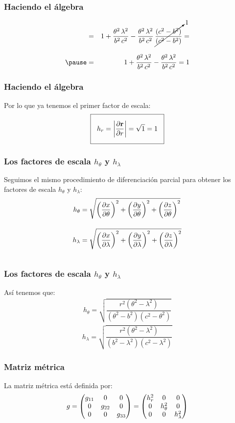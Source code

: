 \begin{frame}
\frametitle{Haciendo el álgebra}
\begin{eqnarray*}
&=& 1 + \dfrac{\theta^{2} \, \lambda^{2}}{b^{2} \, c^{2}} - \dfrac{\theta^{2} \, \lambda^{2}}{b^{2} \, c^{2}} \, \cancelto{1}{\dfrac{(c^{2} - b^{2})}{(c^{2} - b^{2})}} = \\[1em] \pause
&=& 1 + \dfrac{\theta^{2} \, \lambda^{2}}{b^{2} \, c^{2}} - \dfrac{\theta^{2} \, \lambda^{2}}{b^{2} \, c^{2}} =  1
\end{eqnarray*}
\end{frame}
\begin{frame}
\frametitle{Haciendo el álgebra}
Por lo que ya tenemos el primer factor de escala:
\begin{align*}
\setlength{\fboxsep}{3\fboxsep}\boxed{h_{r} = \abs{\pdv{\vb{r}}{r}} = \sqrt{1} = 1}
\end{align*}
\end{frame}
\begin{frame}
\frametitle{Los factores de escala $h_{\theta}$ y $h_{\lambda}$}
Seguimos el mismo procedimiento de diferenciación parcial para obtener los factores de escala $h_{\theta}$ y $h_{\lambda}$:
\begin{align*}
h_{\theta} &= \sqrt{\left( \pdv{x}{\theta} \right)^{2} + \left( \pdv{y}{\theta} \right)^{2} + \left( \pdv{z}{\theta} \right)^{2}} \\[1em]
h_{\lambda} &= \sqrt{\left( \pdv{x}{\lambda} \right)^{2} + \left( \pdv{y}{\lambda} \right)^{2} + \left( \pdv{z}{\lambda} \right)^{2}} \\[1em]
\end{align*}
\end{frame}
\begin{frame}
\frametitle{Los factores de escala $h_{\theta}$ y $h_{\lambda}$}
Así tenemos que:
\begin{align*}
h_{\theta} = \sqrt{\dfrac{r^{2} (\theta^{2} - \lambda^{2})}{(\theta^{2} - b^{2})(c^{2} - \theta^{2})}}
\end{align*}
\pause
\begin{align*}
h_{\lambda} = \sqrt{\dfrac{r^{2} (\theta^{2} - \lambda^{2})}{(b^{2} - \lambda^{2})(c^{2} - \lambda^{2})}}
\end{align*}
\end{frame}
\begin{frame}
\frametitle{Matriz métrica}
La matriz métrica está definida por:
\begin{align*}
g = \mqty(
g_{11} & 0 & 0 \\
0 & g_{22} & 0 \\
0 & 0 & g_{33} \\
) = 
\mqty(
h_{r}^{2} & 0 & 0 \\
0 & h_{\theta}^{2} & 0 \\
0 & 0 & h_{\lambda}^{2}
)
\end{align*}
\end{frame}

